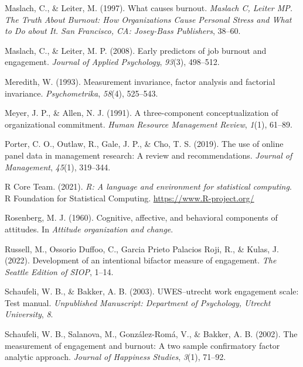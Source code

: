 \documentclass[
  man]{apa7}
\newlength{\cslhangindent}
\newlength{\cslentryspacingunit} %
\newenvironment{CSLReferences}[2] %
 {%
  \setlength{\parindent}{0pt}
  \ifodd #1
  \let\oldpar\par
  \def\par{\hangindent=\cslhangindent\oldpar}
  \fi
  \setlength{\parskip}{#2\cslentryspacingunit}
 }%
 {}
\begin{document}
\begin{CSLReferences}{1}{0}
\leavevmode{}%
Maslach, C., \& Leiter, M. (1997). What causes burnout. \emph{Maslach C, Leiter MP. The Truth About Burnout: How Organizations Cause Personal Stress and What to Do about It. San Francisco, CA: Josey-Bass Publishers}, 38--60.

\leavevmode{}%
Maslach, C., \& Leiter, M. P. (2008). Early predictors of job burnout and engagement. \emph{Journal of Applied Psychology}, \emph{93}(3), 498--512.

\leavevmode{}%
Meredith, W. (1993). Measurement invariance, factor analysis and factorial invariance. \emph{Psychometrika}, \emph{58}(4), 525--543.

\leavevmode{}%
Meyer, J. P., \& Allen, N. J. (1991). A three-component conceptualization of organizational commitment. \emph{Human Resource Management Review}, \emph{1}(1), 61--89.

\leavevmode{}%
Porter, C. O., Outlaw, R., Gale, J. P., \& Cho, T. S. (2019). The use of online panel data in management research: A review and recommendations. \emph{Journal of Management}, \emph{45}(1), 319--344.

\leavevmode{}%
R Core Team. (2021). \emph{R: A language and environment for statistical computing}. R Foundation for Statistical Computing. \url{https://www.R-project.org/}

\leavevmode{}%
Rosenberg, M. J. (1960). Cognitive, affective, and behavioral components of attitudes. In \emph{Attitude organization and change}.

\leavevmode{}%
Russell, M., Ossorio Duffoo, C., Garcia Prieto Palacios Roji, R., \& Kulas, J. (2022). Development of an intentional bifactor measure of engagement. \emph{The Seattle Edition of SIOP}, 1--14.

\leavevmode{}%
Schaufeli, W. B., \& Bakker, A. B. (2003). {UWES}--utrecht work engagement scale: Test manual. \emph{Unpublished Manuscript: Department of Psychology, Utrecht University}, \emph{8}.

\leavevmode{}%
Schaufeli, W. B., Salanova, M., González-Romá, V., \& Bakker, A. B. (2002). The measurement of engagement and burnout: A two sample confirmatory factor analytic approach. \emph{Journal of Happiness Studies}, \emph{3}(1), 71--92.


\end{CSLReferences}
\end{document}
